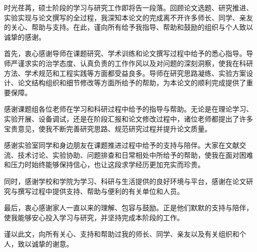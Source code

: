 \begin{ack}
时光荏苒，硕士阶段的学习与研究工作即将告一段落。回顾论文选题、研究推进、实验实现与论文撰写的全过程，我深知本论文的完成离不开许多师长、同学、亲友的关心、帮助与支持。在此，谨向所有给予我指导、帮助和鼓励的组织与个人致以诚挚的感谢。

首先，衷心感谢导师在课题研究、学术训练和论文撰写过程中给予的悉心指导。导师严谨求实的治学态度、认真负责的工作作风以及对问题的深刻洞察，使我在科研方法、学术规范和工程实践等方面都受益良多。导师在研究思路凝练、实验方案设计、论文结构组织和细节修改等方面所给予的帮助，为本论文的顺利完成提供了重要保障。

感谢课题组各位老师在学习和科研过程中给予的指导与帮助。无论是在理论学习、实验开展、设备调试，还是在阶段汇报和论文修改过程中，诸位老师都提出了许多宝贵意见，使我不断完善研究思路、规范研究过程并提升论文质量。

感谢实验室同学和身边朋友在课题推进过程中给予的支持与陪伴。大家在文献交流、技术讨论、实验协助、问题排查和日常相处中所给予的帮助，使我在面对困难和压力时始终能够保持信心，也让这段求学经历更加充实而珍贵。

同时，感谢学校和学院为学习、科研与生活提供的良好环境与平台，感谢在论文研究与撰写过程中提供支持、帮助与便利的有关单位和人员。

最后，衷心感谢家人一直以来的理解、包容与鼓励。正是他们默默的支持与陪伴，使我能够安心投入学习与研究，并坚持完成本阶段的工作。

谨以此文，向所有关心、支持和帮助过我的师长、同学、亲友以及有关组织和个人，致以诚挚的谢意。
\end{ack}
